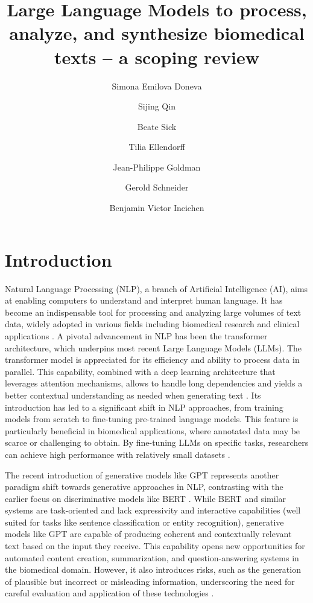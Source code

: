 \documentclass[fleqn,10pt]{olplainarticle}
\title{Large Language Models to process, analyze, and synthesize biomedical texts – a scoping review}
\author[1]{Simona Emilova Doneva}
\author[1]{Sijing Qin}
\author[2]{Beate Sick}
\author[3]{Tilia Ellendorff}
\author[3]{Jean-Philippe Goldman}
\author[3]{Gerold Schneider}
\author[1,4]{Benjamin Victor Ineichen}
\affil[1]{Center for Reproducible Science, University of Zurich, Zurich, Switzerland.}
\affil[2]{ZHAW School of Engineering, Winterthur, Switzerland.}
\affil[3]{Department of Computational Linguistics, University of Zurich, Zurich, Switzerland.}
\affil[4]{Clinical Neuroscience Center, University of Zurich, Zurich, Switzerland.}
\begin{document}
\flushbottom
\maketitle
\thispagestyle{empty}

\section*{Introduction}

Natural Language Processing (NLP), a branch of Artificial Intelligence (AI), aims at enabling computers to understand and interpret human language. It has become an indispensable tool for processing and analyzing large volumes of text data, widely adopted in various fields including biomedical research and clinical applications \citep{zhou2022natural}. %
A pivotal advancement in NLP has been the transformer architecture, which underpins most recent Large Language Models (LLMs). The transformer model is appreciated for its efficiency and ability to process data in parallel. This capability, combined with a deep learning architecture that leverages attention mechanisms, allows to handle long dependencies and yields a better contextual understanding as needed when generating text \citep{vaswani2017attention}. Its introduction has led to a significant shift in NLP approaches, from training models from scratch to fine-tuning pre-trained language models.  This feature is particularly beneficial in biomedical applications, where annotated data may be scarce or challenging to obtain. By fine-tuning LLMs on specific tasks, researchers can achieve high performance with relatively small datasets \citep{wang2023pre}.

The recent introduction of generative models like GPT represents another paradigm shift towards generative approaches in NLP, contrasting with the earlier focus on discriminative models like BERT \citep{radford2018improving,brown2020language}. While BERT and similar systems are task-oriented and lack expressivity and interactive capabilities (well suited for tasks like sentence classification or entity recognition), generative models like GPT are capable of producing coherent and contextually relevant text based on the input they receive. This capability opens new opportunities for automated content creation, summarization, and question-answering systems in the biomedical domain. However, it also introduces risks, such as the generation of plausible but incorrect or misleading information, underscoring the need for careful evaluation and application of these technologies \citep{thirunavukarasu2023large}.
\end{document}
